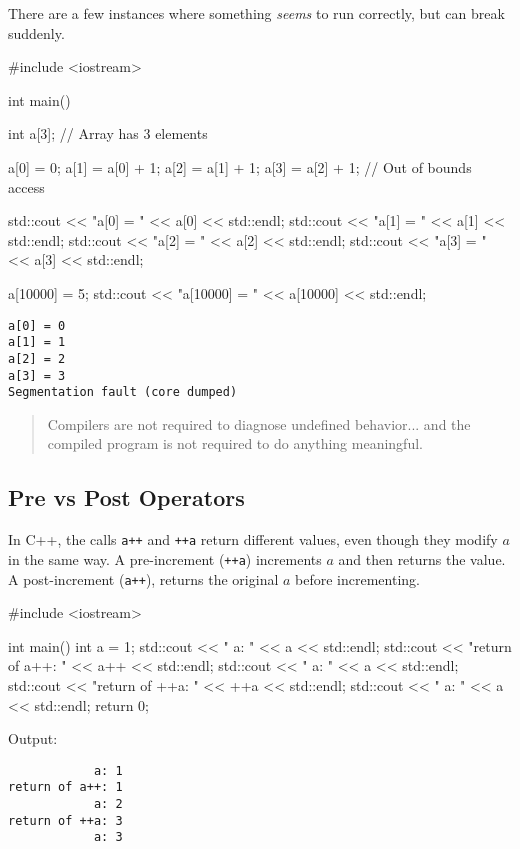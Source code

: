 \documentclass[12pt,letterpaper,twoside]{article}
\begin{document}
There are a few instances where something \textit{seems} to run correctly, but can break suddenly.  

\begin{cpp}
#include <iostream>

int main() {
  int a[3]; // Array has 3 elements

  a[0] = 0;
  a[1] = a[0] + 1;
  a[2] = a[1] + 1;
  a[3] = a[2] + 1; // Out of bounds access

  std::cout << "a[0] = " << a[0] << std::endl;
  std::cout << "a[1] = " << a[1] << std::endl;
  std::cout << "a[2] = " << a[2] << std::endl;
  std::cout << "a[3] = " << a[3] << std::endl;

  a[10000] = 5;
  std::cout << "a[10000] = " << a[10000] << std::endl;
}
\end{cpp}
\vspace{-3ex}
{\footnotesize
\begin{verbatim}
a[0] = 0
a[1] = 1
a[2] = 2
a[3] = 3
Segmentation fault (core dumped)
\end{verbatim}}

\begin{quote}
  Compilers are not required to diagnose undefined behavior... and the
  compiled program is not required to do anything
  meaningful.
\end{quote}

\subsection{Pre vs Post Operators}

In C++, the calls \texttt{a++} and \texttt{++a} return different values, even though they modify $a$ in the same way.  A pre-increment (\texttt{++a}) increments $a$ and then returns the value.  A post-increment (\texttt{a++}), returns the original $a$ before incrementing.

\begin{cpp}
#include <iostream>

int main() {
  int a = 1;
  std::cout << "            a: " << a   << std::endl;
  std::cout << "return of a++: " << a++ << std::endl;
  std::cout << "            a: " << a   << std::endl;
  std::cout << "return of ++a: " << ++a << std::endl;
  std::cout << "            a: " << a   << std::endl;
  return 0;
}
\end{cpp}

Output:

\begin{verbatim}
            a: 1
return of a++: 1
            a: 2
return of ++a: 3
            a: 3
\end{verbatim}
\end{document}
